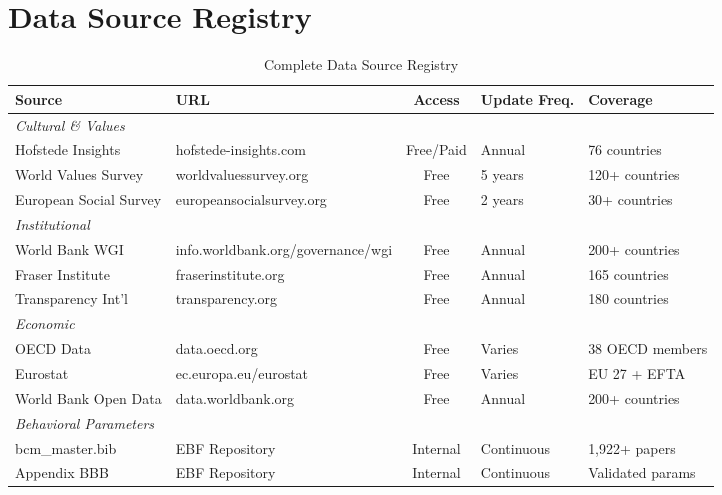 \section{Data Source Registry}
\label{sec:dr-source-registry}

\begin{table}[htbp]
\centering
\caption{Complete Data Source Registry}
\label{tab:dr-source-registry}
\renewcommand{\arraystretch}{1.2}
\scriptsize
\begin{tabular}{@{}p{2.5cm}p{3cm}cp{2cm}p{3cm}@{}}
\toprule
\textbf{Source} & \textbf{URL} & \textbf{Access} & \textbf{Update Freq.} & \textbf{Coverage} \\
\midrule
\multicolumn{5}{l}{\textit{Cultural \& Values}} \\
Hofstede Insights & hofstede-insights.com & Free/Paid & Annual & 76 countries \\
World Values Survey & worldvaluessurvey.org & Free & 5 years & 120+ countries \\
European Social Survey & europeansocialsurvey.org & Free & 2 years & 30+ countries \\
\midrule
\multicolumn{5}{l}{\textit{Institutional}} \\
World Bank WGI & info.worldbank.org/governance/wgi & Free & Annual & 200+ countries \\
Fraser Institute & fraserinstitute.org & Free & Annual & 165 countries \\
Transparency Int'l & transparency.org & Free & Annual & 180 countries \\
\midrule
\multicolumn{5}{l}{\textit{Economic}} \\
OECD Data & data.oecd.org & Free & Varies & 38 OECD members \\
Eurostat & ec.europa.eu/eurostat & Free & Varies & EU 27 + EFTA \\
World Bank Open Data & data.worldbank.org & Free & Annual & 200+ countries \\
\midrule
\multicolumn{5}{l}{\textit{Behavioral Parameters}} \\
bcm\_master.bib & EBF Repository & Internal & Continuous & 1,922+ papers \\
Appendix BBB & EBF Repository & Internal & Continuous & Validated params \\
\bottomrule
\end{tabular}
\end{table}


